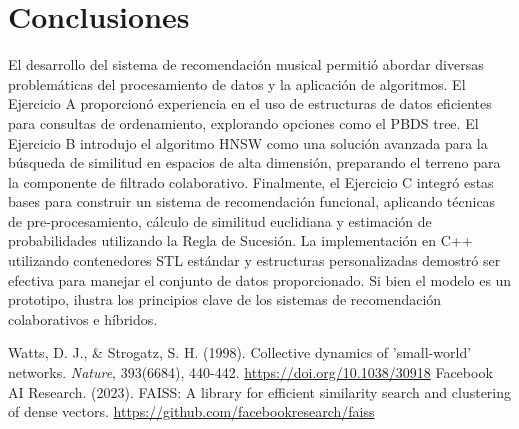 \documentclass{article}
\begin{document}
\section{Conclusiones}

El desarrollo del sistema de recomendación musical permitió abordar diversas problemáticas del procesamiento de datos y la aplicación de algoritmos. El Ejercicio A proporcionó experiencia en el uso de estructuras de datos eficientes para consultas de ordenamiento, explorando opciones como el PBDS tree. El Ejercicio B introdujo el algoritmo HNSW como una solución avanzada para la búsqueda de similitud en espacios de alta dimensión, preparando el terreno para la componente de filtrado colaborativo. Finalmente, el Ejercicio C integró estas bases para construir un sistema de recomendación funcional, aplicando técnicas de pre-procesamiento, cálculo de similitud euclidiana y estimación de probabilidades utilizando la Regla de Sucesión. La implementación en C++ utilizando contenedores STL estándar y estructuras personalizadas demostró ser efectiva para manejar el conjunto de datos proporcionado. Si bien el modelo es un prototipo, ilustra los principios clave de los sistemas de recomendación colaborativos e híbridos.


\begin{thebibliography}{99} %

     Watts, D. J., \& Strogatz, S. H. (1998). Collective dynamics of 'small-world' networks. \textit{Nature}, 393(6684), 440-442. \url{https://doi.org/10.1038/30918}
     Facebook AI Research. (2023). FAISS: A library for efficient similarity search and clustering of dense vectors. \url{https://github.com/facebookresearch/faiss}


\end{thebibliography}

\end{document}
